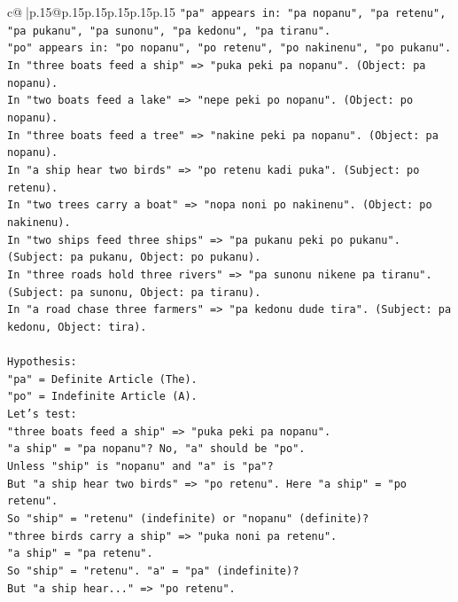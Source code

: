 \documentclass{article}
\begin{document}
{\begin{supertabular}{c@{$\;$}|p{.15\linewidth}@{}p{.15\linewidth}p{.15\linewidth}p{.15\linewidth}p{.15\linewidth}p{.15\linewidth}}
{{{\texttt{"pa" appears in: "pa nopanu", "pa retenu", "pa pukanu", "pa sunonu", "pa kedonu", "pa tiranu".} \\
\texttt{"po" appears in: "po nopanu", "po retenu", "po nakinenu", "po pukanu".} \\
\texttt{In "three boats feed a ship" => "puka peki pa nopanu". (Object: pa nopanu).} \\
\texttt{In "two boats feed a lake" => "nepe peki po nopanu". (Object: po nopanu).} \\
\texttt{In "three boats feed a tree" => "nakine peki pa nopanu". (Object: pa nopanu).} \\
\texttt{In "a ship hear two birds" => "po retenu kadi puka". (Subject: po retenu).} \\
\texttt{In "two trees carry a boat" => "nopa noni po nakinenu". (Object: po nakinenu).} \\
\texttt{In "two ships feed three ships" => "pa pukanu peki po pukanu". (Subject: pa pukanu, Object: po pukanu).} \\
\texttt{In "three roads hold three rivers" => "pa sunonu nikene pa tiranu". (Subject: pa sunonu, Object: pa tiranu).} \\
\texttt{In "a road chase three farmers" => "pa kedonu dude tira". (Subject: pa kedonu, Object: tira).} \\
\\ 
\texttt{Hypothesis:} \\
\texttt{"pa" = Definite Article (The).} \\
\texttt{"po" = Indefinite Article (A).} \\
\texttt{Let's test:} \\
\texttt{"three boats feed a ship" => "puka peki pa nopanu".} \\
\texttt{"a ship" = "pa nopanu"? No, "a" should be "po".} \\
\texttt{Unless "ship" is "nopanu" and "a" is "pa"?} \\
\texttt{But "a ship hear two birds" => "po retenu". Here "a ship" = "po retenu".} \\
\texttt{So "ship" = "retenu" (indefinite) or "nopanu" (definite)?} \\
\texttt{"three birds carry a ship" => "puka noni pa retenu".} \\
\texttt{"a ship" = "pa retenu".} \\
\texttt{So "ship" = "retenu". "a" = "pa" (indefinite)?} \\
\texttt{But "a ship hear..." => "po retenu".} \\
}}}
\end{supertabular}}
\end{document}
